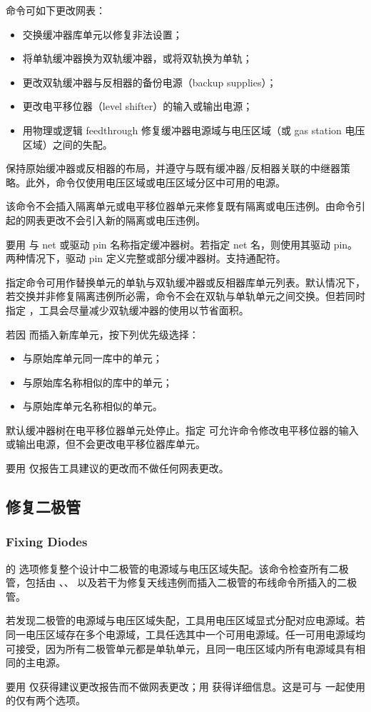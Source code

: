 命令可如下更改网表：
\begin{itemize}
  \item 交换缓冲器库单元以修复非法设置；
  \item 将单轨缓冲器换为双轨缓冲器，或将双轨换为单轨；
  \item 更改双轨缓冲器与反相器的备份电源（backup supplies）；
  \item 更改电平移位器（level shifter）的输入或输出电源；
  \item 用物理或逻辑 feedthrough 修复缓冲器电源域与电压区域（或 gas station 电压区域）之间的失配。
\end{itemize}

 保持原始缓冲器或反相器的布局，并遵守与既有缓冲器/反相器关联的中继器策略。此外，命令仅使用电压区域或电压区域分区中可用的电源。

该命令不会插入隔离单元或电平移位器单元来修复既有隔离或电压违例。由命令引起的网表更改不会引入新的隔离或电压违例。

要用  与 net 或驱动 pin 名称指定缓冲器树。若指定 net 名，则使用其驱动 pin。两种情况下，驱动 pin 定义完整或部分缓冲器树。支持通配符。

 指定命令可用作替换单元的单轨与双轨缓冲器或反相器库单元列表。默认情况下，若交换并非修复隔离违例所必需，命令不会在双轨与单轨单元之间交换。但若同时指定 ，工具会尽量减少双轨缓冲器的使用以节省面积。

若因  而插入新库单元，按下列优先级选择：
\begin{itemize}
  \item 与原始库单元同一库中的单元；
  \item 与原始库名称相似的库中的单元；
  \item 与原始库单元名称相似的单元。
\end{itemize}

默认缓冲器树在电平移位器单元处停止。指定  可允许命令修改电平移位器的输入或输出电源，但不会更改电平移位器库单元。

要用  仅报告工具建议的更改而不做任何网表更改。

\subsection{修复二极管}
\subsubsection*{Fixing Diodes}

 的  选项修复整个设计中二极管的电源域与电压区域失配。该命令检查所有二极管，包括由 、、 以及若干为修复天线违例而插入二极管的布线命令所插入的二极管。

若发现二极管的电源域与电压区域失配，工具用电压区域显式分配对应电源域。若同一电压区域存在多个电源域，工具任选其中一个可用电源域。任一可用电源域均可接受，因为所有二极管单元都是单轨单元，且同一电压区域内所有电源域具有相同的主电源。

要用  仅获得建议更改报告而不做网表更改；用  获得详细信息。这是可与  一起使用的仅有两个选项。
